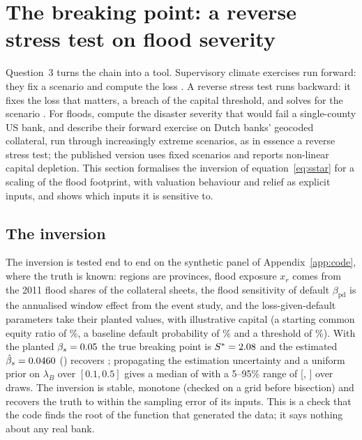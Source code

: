 \section{The breaking point: a reverse stress test on flood severity}\label{sec:stress}

Question~3 turns the chain into a tool. Supervisory climate exercises run forward: they fix a scenario and compute the loss \citep{ecb2022climate,fed2024pilot,boe2022results}. A reverse stress test runs backward: it fixes the loss that matters, a breach of the capital threshold, and solves for the scenario \citep{grundke2018macroeconomic,glasserman2015stress}. For floods, \citet{blickle2025bad} compute the disaster severity that would fail a single-county US bank, and \citet{caloia2021flood} describe their forward exercise on Dutch banks' geocoded collateral, run through increasingly extreme scenarios, as in essence a reverse stress test; the published version \citep{caloia2026floods} uses fixed scenarios and reports non-linear capital depletion. This section formalises the inversion of equation~\eqref{eq:sstar} for a scaling of the flood footprint, with valuation behaviour and relief as explicit inputs, and shows which inputs it is sensitive to.

\subsection{The inversion}

The inversion is tested end to end on the synthetic panel of Appendix~\ref{app:code}, where the truth is known: regions are provinces, flood exposure $x_r$ comes from the 2011 flood shares of the collateral sheets, the flood sensitivity of default $\beta_{\mathrm{pd}}$ is the annualised window effect from the event study, and the loss-given-default parameters take their planted values, with illustrative capital (a starting common equity ratio of \rqThreeCetBefore\%, a baseline default probability of \rqThreePdZero\% and a threshold of \rqThreeKappa\%). With the planted $\beta_s = 0.05$ the true breaking point is $S^* = 2.08$ and the estimated $\hat\beta_s = 0.0460$ (\rqThreeBetaSe) recovers \rqThreeSHat; propagating the estimation uncertainty and a uniform prior on $\lambda_B$ over $[0.1, 0.5]$ gives a median of \rqThreeSMedian{} with a 5--95\% range of [\rqThreeSLow, \rqThreeSHigh] over \rqThreeDraws{} draws. The inversion is stable, monotone (checked on a grid before bisection) and recovers the truth to within the sampling error of its inputs. This is a check that the code finds the root of the function that generated the data; it says nothing about any real bank.

